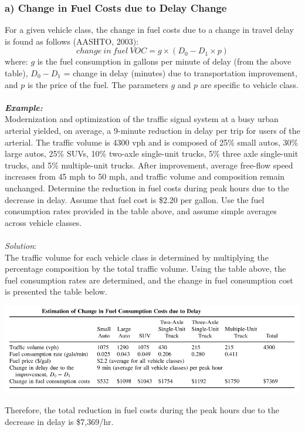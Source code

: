 \subsubsection{a) Change in Fuel Costs due to Delay Change}
For a given vehicle class, the change in fuel costs due to a change in travel delay is found as follows (AASHTO, 2003):
\begin{equation}
	change \: in \: fuel \: VOC = g \times (D_0 - D_1 \times p)
\end{equation}
where: $ g $ is the fuel consumption in gallons per minute of delay (from the above table), $ D_0 - D_1 $ = change in delay (minutes) due to transportation improvement, and $ p $ is the price of the fuel. The parameters $ g $ and $ p $ are specific to vehicle class.\\\\
\textbf{\textit{Example:}}\\
Modernization and optimization of the traffic signal system at a busy urban arterial yielded, on average, a 9-minute reduction in delay per trip for users of the arterial. The traffic volume is 4300 vph and is composed of 25\% small autos, 30\% large autos, 25\% SUVs, 10\% two-axle single-unit trucks, 5\% three axle single-unit trucks, and 5\% multiple-unit trucks. After improvement, average free-flow speed increases from 45 mph to 50 mph, and traffic volume and composition remain unchanged. Determine the reduction in fuel costs during peak hours due to the decrease in delay. Assume that fuel cost is \$2.20 per gallon. Use the fuel consumption rates provided in the table above, and assume simple averages across vehicle classes.\\\\
\textit{Solution}:\\
The traffic volume for each vehicle class is determined by multiplying the percentage composition by the total traffic volume. Using the table above, the fuel consumption rates are determined, and the change in fuel consumption cost is presented the table below.
\begin{center}
	\includegraphics[scale= 0.55]{gfx/fig68.png}
\end{center}
Therefore, the total reduction in fuel costs during the peak hours due to the decrease in delay is \$7,369/hr.
%
